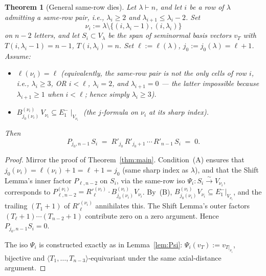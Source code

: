 \documentclass[11pt]{article}
\newtheorem{theorem}{Theorem}
\theoremstyle{definition}
\begin{document}
\begin{theorem}[General same-row dies]\label{thm:framework}
Let $\lambda \vdash n$, and let $i$ be a row of $\lambda$ admitting a
same-row pair, i.e., $\lambda_i \ge 2$ and $\lambda_{i+1} \le \lambda_i - 2$.
Set
\[
   \nu_i := \lambda \setminus \{(i, \lambda_i - 1), (i, \lambda_i)\}
\]
on $n - 2$ letters, and let $S_i \subset V_\lambda$ be the span of
seminormal basis vectors $v_T$ with $T(i, \lambda_i - 1) = n - 1$,
$T(i, \lambda_i) = n$. Set $\ell := \ell(\lambda)$, $j_0 := j_0(\lambda)
= \ell + 1$. Assume:
\begin{itemize}[leftmargin=2em,topsep=0.2em,itemsep=0.1em]
\item[(A)] $\ell(\nu_i) = \ell$ (equivalently, the same-row pair is
not the only cells of row $i$, i.e., $\lambda_i \ge 3$, OR $i < \ell$,
$\lambda_i = 2$, and $\lambda_{i+1} = 0$ --- the latter impossible
because $\lambda_{i+1} \ge 1$ when $i < \ell$; hence simply
$\lambda_i \ge 3$).
\item[(B)] $B^{(\nu_i)}_{j_0(\nu_i)}\,V_{\nu_i}
\subseteq E_1^-\!\mid_{V_{\nu_i}}$ (the $j$-formula on $\nu_i$ at its
sharp index).
\end{itemize}
Then
\[
   P_{j_0, n-1}\,S_i \;=\; R'_{j_0}\,R'_{j_0+1}\,\cdots\,R'_{n-1}\,S_i
   \;=\; 0.
\]
\end{theorem}

\begin{proof}
Mirror the proof of Theorem~\ref{thm:main}. Condition~(A) ensures
that $j_0(\nu_i) = \ell(\nu_i) + 1 = \ell + 1 = j_0$ (same sharp
index as $\lambda$), and that the Shift Lemma's inner factor
$P_{\ell, n-2}$ on $S_i$, via the same-row iso $\Psi_i: S_i
\xrightarrow{\sim} V_{\nu_i}$, corresponds to $P^{(\nu_i)}_{\ell, n-2}
= R'^{(\nu_i)}_\ell \cdot B^{(\nu_i)}_{j_0(\nu_i)} V_{\nu_i}$. By~(B),
$B^{(\nu_i)}_{j_0(\nu_i)} V_{\nu_i} \subseteq E_1^-|_{V_{\nu_i}}$, and
the trailing $(T_1+1)$ of $R'^{(\nu_i)}_\ell$ annihilates this. The
Shift Lemma's outer factors $(T_{\ell}+1) \cdots (T_{n-2}+1)$
contribute zero on a zero argument. Hence $P_{j_0, n-1} S_i = 0$.

The iso $\Psi_i$ is constructed exactly as in Lemma~\ref{lem:Psi}:
$\Psi_i(v_T) := v_{T|_{\nu_i}}$, bijective and
$\langle T_1, \ldots, T_{n-3}\rangle$-equivariant under the same
axial-distance argument.
\end{proof}
\end{document}
